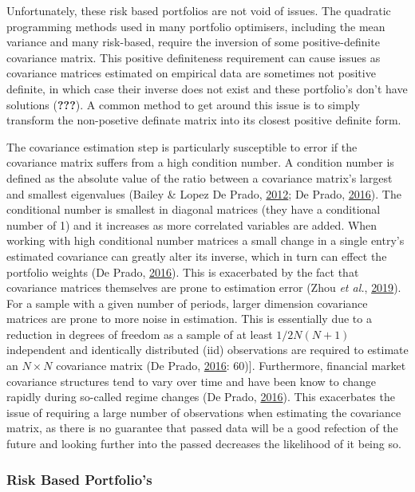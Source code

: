 \documentclass[11pt,preprint, authoryear]{elsarticle}
\numberwithin{equation}{section}
\numberwithin{figure}{section}
\numberwithin{table}{section}
\begin{document}
Unfortunately, these risk based portfolios are not void of issues. The
quadratic programming methods used in many portfolio optimisers,
including the mean variance and many risk-based, require the inversion
of some positive-definite covariance matrix. This positive definiteness
requirement can cause issues as covariance matrices estimated on
empirical data are sometimes not positive definite, in which case their
inverse does not exist and these portfolio's don't have solutions
({\textbf{???}}). A common method to get around this issue is to simply
transform the non-posetive definate matrix into its closest positive
definite form.

The covariance estimation step is particularly susceptible to error if
the covariance matrix suffers from a high condition number. A condition
number is defined as the absolute value of the ratio between a
covariance matrix's largest and smallest eigenvalues (Bailey \& Lopez De
Prado, \protect\hyperlink{ref-lopez2012}{2012}; De Prado,
\protect\hyperlink{ref-lopez}{2016}). The conditional number is smallest
in diagonal matrices (they have a conditional number of 1) and it
increases as more correlated variables are added. When working with high
conditional number matrices a small change in a single entry's estimated
covariance can greatly alter its inverse, which in turn can effect the
portfolio weights (De Prado, \protect\hyperlink{ref-lopez}{2016}). This
is exacerbated by the fact that covariance matrices themselves are prone
to estimation error (Zhou \emph{et al.},
\protect\hyperlink{ref-zhou2019}{2019}). For a sample with a given
number of periods, larger dimension covariance matrices are prone to
more noise in estimation. This is essentially due to a reduction in
degrees of freedom as a sample of at least \(1/2N(N+1)\) independent and
identically distributed (iid) observations are required to estimate an
\(N\times N\) covariance matrix (De Prado,
\protect\hyperlink{ref-lopez}{2016}: 60){]}. Furthermore, financial
market covariance structures tend to vary over time and have been know
to change rapidly during so-called regime changes (De Prado,
\protect\hyperlink{ref-lopez}{2016}). This exacerbates the issue of
requiring a large number of observations when estimating the covariance
matrix, as there is no guarantee that passed data will be a good
refection of the future and looking further into the passed decreases
the likelihood of it being so.

\hypertarget{risk-based-portfolios}{%
\subsubsection{Risk Based Portfolio's}\label{risk-based-portfolios}}
\end{document}
